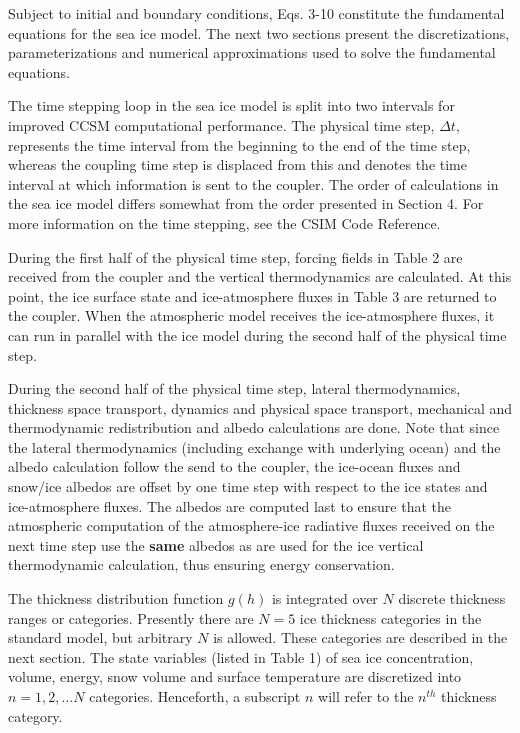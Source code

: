 \vskip 8pt

Subject to initial and boundary conditions, Eqs. 3-10 constitute the 
fundamental equations for the sea ice model. The next two sections present 
the discretizations, parameterizations and numerical approximations used 
to solve the fundamental equations. 

\vfill
\eject
{}

\vskip 8pt

The time stepping loop in the sea ice model is split into two intervals for 
improved CCSM computational performance. The physical time step, $\Delta t$, 
represents the time interval from the beginning to the end of the time step, 
whereas the coupling time step is displaced from this and denotes the time 
interval at which information is sent to the coupler. The order of calculations 
in the sea ice model differs somewhat from the order presented in Section 4. 
For more information on the time stepping, see the CSIM Code Reference.

During the first half of the physical time step, forcing fields in Table 2 are 
received from the coupler and the vertical thermodynamics are calculated. At 
this point, the ice surface state and ice-atmosphere fluxes in Table 3 are 
returned to the coupler. When the atmospheric model receives the ice-atmosphere 
fluxes, it can run in parallel with the ice model during the second half of the 
physical time step.

During the second half of the physical time step, lateral thermodynamics, thickness 
space transport, dynamics and physical space transport, mechanical and thermodynamic 
redistribution and albedo calculations are done. Note that since the lateral 
thermodynamics (including exchange with underlying ocean) and the albedo calculation 
follow the send to the coupler, the ice-ocean fluxes and snow/ice albedos 
are offset by one time step with respect to the ice states and ice-atmosphere fluxes. 
The albedos are computed last to ensure that the atmospheric computation  of the 
atmosphere-ice radiative fluxes received on the next time step use the {\bf{same}} 
albedos as are used for the ice vertical thermodynamic calculation, thus ensuring
energy conservation. 

\vskip 8pt

The thickness distribution function $g(h)$ is integrated over $N$ discrete thickness 
ranges or categories. Presently there are $N=5$ ice thickness categories in the
standard model, but arbitrary $N$ is allowed. These categories are described in the
next section. The state variables (listed in Table 1) of
sea ice concentration, volume, energy, snow volume and surface temperature are 
discretized into $n=1,2,...N$ categories. Henceforth, a subscript $n$ will refer 
to the $n^{th}$ thickness category.

